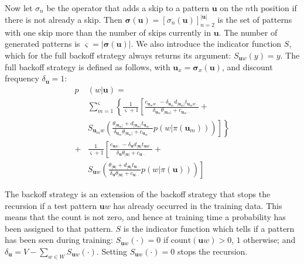 Now let $\sigma_n$ be the operator that adds a skip to a pattern $\mathbf{u}$ on the $n$th position if there is not already a skip. Then $\boldsymbol\sigma(\mathbf{u}) = \left[\sigma_n(\mathbf{u})\right]_{n=2}^{|\mathbf{u}|}$ is the set of patterns with one skip more than the number of skips currently in $\mathbf{u}$. The number of generated patterns is $\boldsymbol\varsigma=|\boldsymbol\sigma(\mathbf{u})|$.
We also introduce the indicator function $S$, which for the {\sf full} backoff strategy always returns its argument: $S_{\mathbf{u}w}(y) = y$.
%
%
The {\sf full} backoff strategy is defined as follows, with $\mathbf{u}_x = \boldsymbol\sigma_x(\mathbf{u})$, and discount frequency $\delta_{\mathbf{u}} = 1$:
 \begin{equation*}
 \begin{split}
p&(w|\mathbf{u}) = \\ 
&\sum_{m=1}^{\boldsymbol\varsigma}\left\{ \frac{1}{\mathbf{\boldsymbol\varsigma}+1}\left[
\frac{c_{\mathbf{u}_mw\cdot}-\delta_{\mathbf{u}_m}d_{|\mathbf{u}_m|}t_{\mathbf{u}_mw\cdot}}{\delta_{\mathbf{u}_m}\theta_{|\mathbf{u}_m|}+c_{\mathbf{u}_m\cdot\cdot}}\right.\right. + \\
 & \left.\left.S_{\mathbf{u}_mw}\left(
\frac{\theta_{|\mathbf{u}_m|}+d_{|\mathbf{u}_m|}t_{\mathbf{u}_m\cdot\cdot}}{\delta_{\mathbf{u}_m}\theta_{|\mathbf{u}_m|}+c_{\mathbf{u}_m\cdot\cdot}}
p(w|\pi(\mathbf{u}_m))\right)\right] \right\} \\ 
+ 
& \frac{1}{\mathbf{\boldsymbol\varsigma}+1}\left[
\frac{c_{\mathbf{u}w\cdot}-\delta_{\mathbf{u}}d_{|\mathbf{u}|}t_{\mathbf{u}w\cdot}}{\delta_{\mathbf{u}}\theta_{|\mathbf{u}|}+c_{\mathbf{u}\cdot\cdot}}+\right. \\
& \left.S_{\mathbf{u}w}\left(\frac{\theta_{|\mathbf{u}|}+d_{|\mathbf{u}|}t_{\mathbf{u}\cdot\cdot}}{\delta_{\mathbf{u}}\theta_{|\mathbf{u}|}+c_{\mathbf{u}\cdot\cdot}}
p(w|\pi(\mathbf{u}))\right)\right]
  \end{split}\end{equation*}
 
 The \BOL backoff strategy is an extension of the \BOF backoff strategy that stops the recursion if a test pattern $\mathbf{u}w$ has already occurred in the training data. This means that the count is not zero, and hence at training time a probability has been assigned to that pattern. $S$ is the indicator function which tells if a pattern has been seen during training: $S_{\mathbf{u}w}(\cdot) = 0$ if $\mathrm{count}(\mathbf{u}w) > 0$, $1$ otherwise; and $\delta_{\mathbf{u}} = V-\sum_{w\in W} S_{\mathbf{u}w}(\cdot)$. Setting $S_{\mathbf{u}w}(\cdot) = 0$ stops the recursion.

